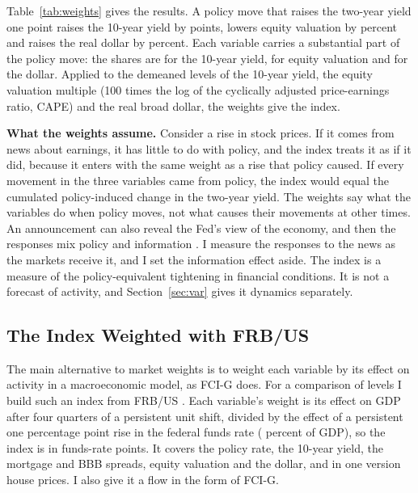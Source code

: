 \documentclass[11pt]{article}
\begin{document}
Table~\ref{tab:weights} gives the results. A policy move that raises the two-year yield one point raises the 10-year yield by  points, lowers equity valuation by  percent and raises the real dollar by  percent. Each variable carries a substantial part of the policy move: the shares are  for the 10-year yield,  for equity valuation and  for the dollar. Applied to the demeaned levels of the 10-year yield, the equity valuation multiple (100 times the log of the cyclically adjusted price-earnings ratio, CAPE) and the real broad dollar, the weights give the index.



\textbf{What the weights assume.} Consider a rise in stock prices. If it comes from news about earnings, it has little to do with policy, and the index treats it as if it did, because it enters with the same weight as a rise that policy caused. If every movement in the three variables came from policy, the index would equal the cumulated policy-induced change in the two-year yield. The weights say what the variables do when policy moves, not what causes their movements at other times. An announcement can also reveal the Fed's view of the economy, and then the responses mix policy and information \citep{nakamura2018}. I measure the responses to the news as the markets receive it, and I set the information effect aside. The index is a measure of the policy-equivalent tightening in financial conditions. It is not a forecast of activity, and Section~\ref{sec:var} gives it dynamics separately.

\subsection{The Index Weighted with FRB/US}\label{sec:frbus}
The main alternative to market weights is to weight each variable by its effect on activity in a macroeconomic model, as FCI-G does. For a comparison of levels I build such an index from FRB/US \citep{brayton2014}. Each variable's weight is its effect on GDP after four quarters of a persistent unit shift, divided by the effect of a persistent one percentage point rise in the federal funds rate ( percent of GDP), so the index is in funds-rate points. It covers the policy rate, the 10-year yield, the mortgage and BBB spreads, equity valuation and the dollar, and in one version house prices. I also give it a flow in the form of FCI-G.
\end{document}
